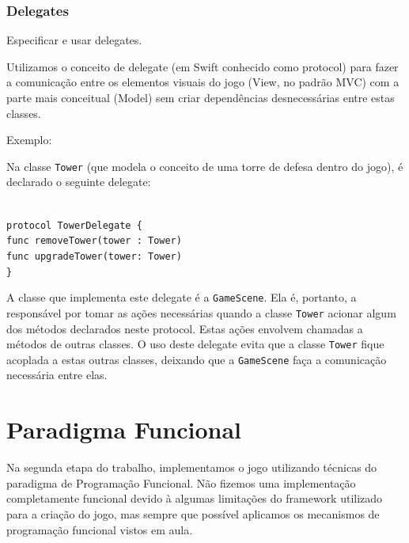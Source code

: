 \documentclass[rel_mlp]{iiufrgs}
\newcommand\tab[1][1cm]{\hspace*{#1}}
\begin{document}


\subsubsection{Delegates}

Especificar e usar delegates.

Utilizamos o conceito de delegate (em Swift conhecido como protocol) para fazer a comunicação entre os elementos visuais do jogo (View, no padrão MVC) com a parte mais conceitual (Model) sem criar dependências desnecessárias entre estas classes.

Exemplo:

Na classe \texttt{Tower} (que modela o conceito de uma torre de defesa dentro do jogo), é declarado o seguinte delegate:

\texttt{\\ protocol TowerDelegate \{\\\tab func removeTower(tower : Tower)\\\tab func upgradeTower(tower: Tower)\\\}}

A classe que implementa este delegate é a \texttt{GameScene}. Ela é, portanto, a responsável por tomar as ações necessárias quando a classe \texttt{Tower} acionar algum dos métodos declarados neste protocol. Estas ações envolvem chamadas a métodos de outras classes. O uso deste delegate evita que a classe \texttt{Tower} fique acoplada a estas outras classes, deixando que a \texttt{GameScene} faça a comunicação necessária entre elas.

%
\section{Paradigma Funcional}

Na segunda etapa do trabalho, implementamos o jogo utilizando técnicas do paradigma de Programação Funcional. Não fizemos uma implementação completamente funcional devido à algumas limitações do framework utilizado para a criação do jogo, mas sempre que possível aplicamos os mecanismos de programação funcional vistos em aula.
\end{document}
